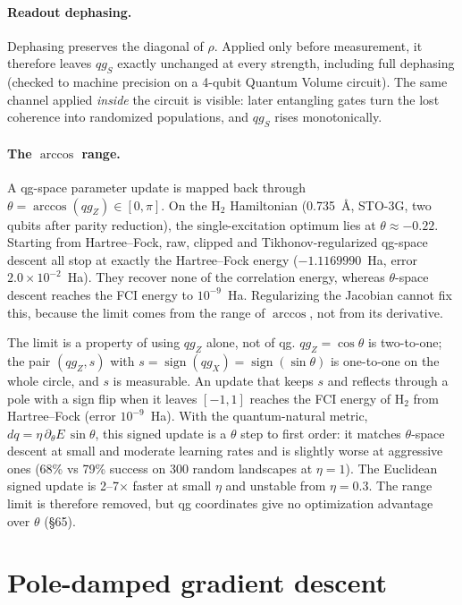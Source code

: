 \documentclass[11pt]{article}
\newcommand{\qgZ}{qg_Z}
\newcommand{\qgS}{qg_S}
\begin{document}
\paragraph{Readout dephasing.} Dephasing preserves the diagonal of $\rho$. Applied only before
measurement, it therefore leaves $\qgS$ exactly unchanged at every strength, including full
dephasing (checked to machine precision on a 4-qubit Quantum Volume circuit). The same channel
applied \emph{inside} the circuit is visible: later entangling gates turn the lost coherence into
randomized populations, and $\qgS$ rises monotonically.

\paragraph{The $\arccos$ range.} A qg-space parameter update is mapped back through
$\theta=\arccos(\qgZ)\in[0,\pi]$. On the H$_2$ Hamiltonian (0.735~\AA, STO-3G, two qubits after
parity reduction), the single-excitation optimum lies at $\theta\approx-0.22$. Starting from
Hartree--Fock, raw, clipped and Tikhonov-regularized qg-space descent all stop at exactly the
Hartree--Fock energy ($-1.1169990$~Ha, error $2.0\times10^{-2}$~Ha). They recover none of the
correlation energy, whereas $\theta$-space descent reaches the FCI energy to $10^{-9}$~Ha.
Regularizing the Jacobian cannot fix this, because the limit comes from the range of $\arccos$,
not from its derivative.

The limit is a property of using $\qgZ$ alone, not of qg. $\qgZ=\cos\theta$ is two-to-one; the pair
$(\qgZ,s)$ with $s=\operatorname{sign}(qg_X)=\operatorname{sign}(\sin\theta)$ is one-to-one on the whole
circle, and $s$ is measurable. An update that keeps $s$ and reflects through a pole with a sign flip
when it leaves $[-1,1]$ reaches the FCI energy of H$_2$ from Hartree--Fock (error $10^{-9}$~Ha). With the
quantum-natural metric, $dq=\eta\,\partial_\theta E\,\sin\theta$, this signed update is a $\theta$ step to
first order: it matches $\theta$-space descent at small and moderate learning rates and is slightly worse
at aggressive ones (68\% vs 79\% success on 300 random landscapes at $\eta=1$). The Euclidean signed
update is 2--7$\times$ faster at small $\eta$ and unstable from $\eta=0.3$. The range limit is
therefore removed, but qg coordinates give no optimization advantage over $\theta$ (\S65).

\section{Pole-damped gradient descent}\label{sec:opt}
\end{document}
